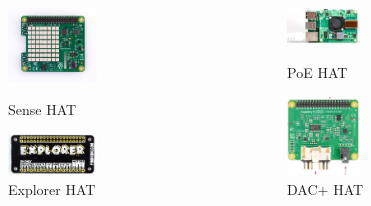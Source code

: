 \documentclass[aspectratio=169,xcolor=dvipsnames]{beamer}
\begin{document}
\begin{frame}
    \begin{columns}[c] %

        \begin{figure}
            \includegraphics[width=0.5\textwidth]{images/sense_hat.jpg}
            \captionsetup{labelformat=empty}
            \caption{Sense HAT}

            \includegraphics[width=0.5\textwidth]{images/explorer_hat.jpg}
            \captionsetup{labelformat=empty}
            \caption{Explorer HAT}
        \end{figure}

        \begin{figure}
            \includegraphics[width=0.5\textwidth]{images/poe_hat.jpg}
            \captionsetup{labelformat=empty}
            \caption{PoE HAT}

            \includegraphics[width=0.5\textwidth]{images/dac_hat.jpg}
            \captionsetup{labelformat=empty}
            \caption{DAC+ HAT}
        \end{figure}

    \end{columns}
\end{frame}
\end{document}
